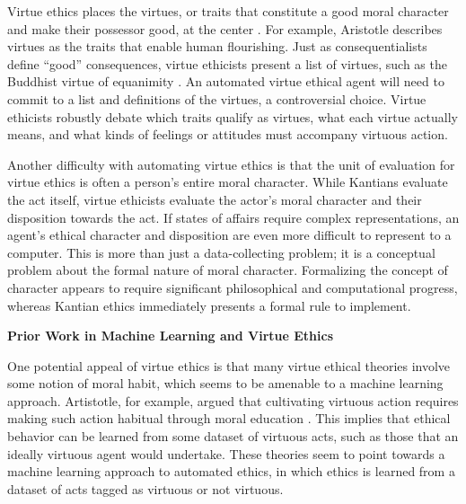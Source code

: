 \begin{isabellebody}
\isadelimdocument
%
\endisadelimdocument
%
\isatagdocument
%
\isamarkuptrue%
%
\endisatagdocument
{\isafolddocument}%
%
\isadelimdocument
%
\endisadelimdocument
%
\begin{isamarkuptext}%
Virtue ethics places the virtues, or traits that constitute a good moral character and make 
their possessor good, at the center \citep{vesep}. For example, Aristotle describes virtues as the 
traits that enable human flourishing. Just as consequentialists define ``good'' consequences, virtue 
ethicists present a list of virtues, such as the Buddhist virtue of equanimity \citep{mcrae}. An automated virtue 
ethical agent will need to commit to a list and definitions of the virtues, a controversial choice. 
Virtue ethicists robustly debate which traits qualify as virtues, what each virtue actually means, and 
what kinds of feelings or attitudes must accompany virtuous action.%
\end{isamarkuptext}\isamarkuptrue%
%
\begin{isamarkuptext}%
Another difficulty with automating virtue ethics is that the unit of evaluation for virtue ethics
is often a person's entire moral character. While Kantians evaluate the act itself, virtue ethicists 
evaluate the actor's moral character and their 
disposition towards the act. If states of affairs
require complex representations, an agent's ethical character and disposition are even more difficult
to represent to a computer. This is more than just a data-collecting problem; it is a conceptual problem 
about the formal nature of moral character.
Formalizing the concept of character appears to require significant philosophical and computational
progress, whereas Kantian ethics immediately presents a formal rule to implement.%
\end{isamarkuptext}\isamarkuptrue%
%
\begin{isamarkuptext}%
\noindent \textbf{Prior Work in Machine Learning and Virtue Ethics}%
\end{isamarkuptext}\isamarkuptrue%
%
\begin{isamarkuptext}%
One potential appeal of virtue ethics is that many virtue ethical theories involve some notion of 
moral habit, which seems to be amenable to a machine learning approach. Artistotle, for example, argued 
that cultivating virtuous action requires making such action habitual through moral education \citep{aristotle}. This
implies that ethical behavior can be learned from some dataset of virtuous acts, such as
those that an ideally virtuous agent would undertake. These 
theories seem to point towards a machine learning approach to automated ethics, in which ethics is 
learned from a dataset of acts tagged as virtuous or not virtuous. 


\end{isamarkuptext}
\end{isabellebody}
